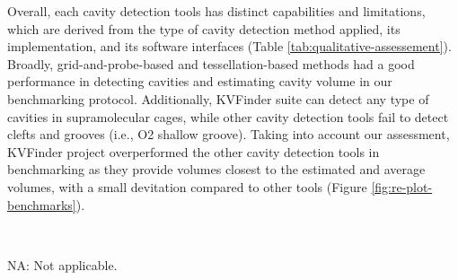 \documentclass[Ingles]{phdthesis}
\def\ie{i.e.\onedot}
\begin{document}
Overall, each cavity detection tools has distinct capabilities and limitations, which are derived from the type of cavity detection method applied, its implementation, and its software interfaces (Table \ref{tab:qualitative-assessement}). Broadly, grid-and-probe-based and tessellation-based methods had a good performance in detecting cavities and estimating cavity volume in our benchmarking protocol. Additionally, KVFinder suite can detect any type of cavities in supramolecular cages, while other cavity detection tools fail to detect clefts and grooves (\ie, O2 shallow groove). Taking into account our assessment, KVFinder project overperformed the other cavity detection tools in benchmarking as they provide volumes closest to the estimated and average volumes, with a small devitation compared to other tools (Figure \ref{fig:re-plot-benchmarks}).

\begin{table}[!ht]
  \centering
  \caption[Qualitative assessment of well-established cavity detection tools]{\textbf{Qualitative assessment of well-established cavity detection tools.}}
   \\
  \vspace{0.1cm} \raggedright \hspace{0.02cm} \scriptsize{NA: Not applicable.} \\
  \label{tab:qualitative-assessement}
\end{table}
\end{document}
